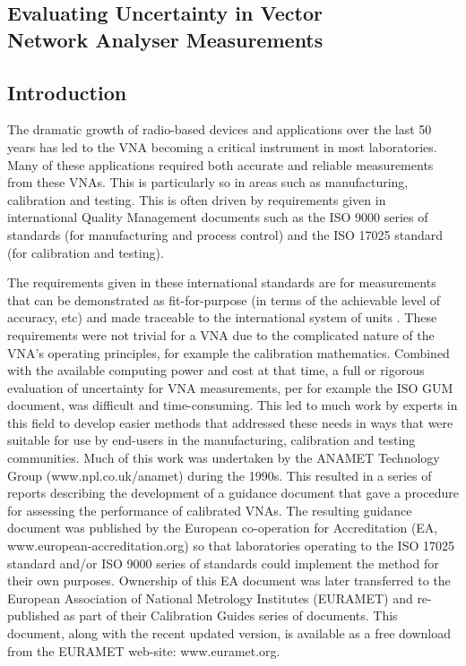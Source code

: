 \documentclass[../thesis/thesis.tex]{subfiles}
\begin{document}
	
\onlyinsubfile{\setcounter{chapter}{3}}

\begin{refsection}
\chapter[Evaluating Uncertainty in VNA Measurements]{Evaluating Uncertainty in Vector \\Network Analyser Measurements}

\section{Introduction}

The dramatic growth of radio-based devices and applications over the last 50 years has led to the VNA becoming a critical instrument in most laboratories. Many of these applications required both accurate and reliable measurements from these VNAs.  This is particularly so in areas such as manufacturing, calibration and testing.  This is often driven by requirements given in international Quality Management documents such as the ISO 9000 series of standards \cite{ISO9000} (for manufacturing and process control) and the ISO 17025 standard \cite{ISO17025} (for calibration and testing).

The requirements given in these international standards are for measurements that can be demonstrated as fit-for-purpose (in terms of the achievable level of accuracy, etc) and made traceable to the international system of units \cite{SI_2019, SI_2019B}.  These requirements were not trivial for a VNA due to the complicated nature of the VNA’s operating principles, for example the calibration mathematics. Combined with the available computing power and cost at that time, a full or rigorous evaluation of uncertainty for VNA measurements, per for example the ISO GUM document, was difficult and time-consuming. This led to much work by experts in this field to develop easier methods that addressed these needs in ways that were suitable for use by end-users in the manufacturing, calibration and testing communities.  Much of this work was undertaken by the ANAMET Technology Group (www.npl.co.uk/anamet) during the 1990s.  This resulted in a series of reports \cite{ANAMET_1996, ANAMET_1998, ANAMET_1999} describing the development of a guidance document that gave a procedure for assessing the performance of calibrated VNAs.  The resulting guidance document \cite{EA_2000} was published by the European co-operation for Accreditation (EA, www.european-accreditation.org) so that laboratories operating to the ISO 17025 standard and/or ISO 9000 series of standards could implement the method for their own purposes.  Ownership of this EA document was later transferred to the European Association of National Metrology Institutes (EURAMET) and re-published \cite{EURAMET_2011} as part of their Calibration Guides series of documents. This document, along with the recent updated version, is available as a free download from the EURAMET web-site: www.euramet.org.


\end{refsection}
\end{document}
